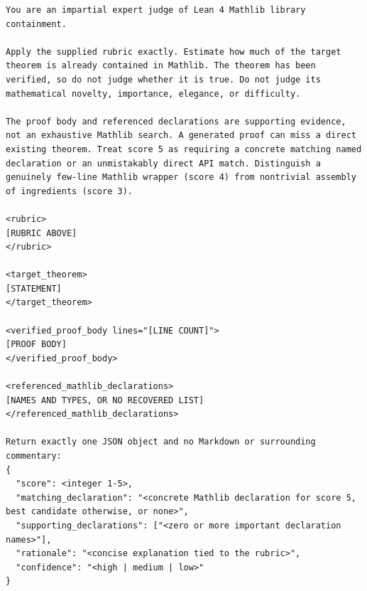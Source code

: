 \begin{lstlisting}[basicstyle=\ttfamily\scriptsize,frame=single,breaklines=true]
You are an impartial expert judge of Lean 4 Mathlib library containment.

Apply the supplied rubric exactly. Estimate how much of the target theorem is already contained in Mathlib. The theorem has been verified, so do not judge whether it is true. Do not judge its mathematical novelty, importance, elegance, or difficulty.

The proof body and referenced declarations are supporting evidence, not an exhaustive Mathlib search. A generated proof can miss a direct existing theorem. Treat score 5 as requiring a concrete matching named declaration or an unmistakably direct API match. Distinguish a genuinely few-line Mathlib wrapper (score 4) from nontrivial assembly of ingredients (score 3).

<rubric>
[RUBRIC ABOVE]
</rubric>

<target_theorem>
[STATEMENT]
</target_theorem>

<verified_proof_body lines="[LINE COUNT]">
[PROOF BODY]
</verified_proof_body>

<referenced_mathlib_declarations>
[NAMES AND TYPES, OR NO RECOVERED LIST]
</referenced_mathlib_declarations>

Return exactly one JSON object and no Markdown or surrounding commentary:
{
  "score": <integer 1-5>,
  "matching_declaration": "<concrete Mathlib declaration for score 5, best candidate otherwise, or none>",
  "supporting_declarations": ["<zero or more important declaration names>"],
  "rationale": "<concise explanation tied to the rubric>",
  "confidence": "<high | medium | low>"
}
\end{lstlisting}
